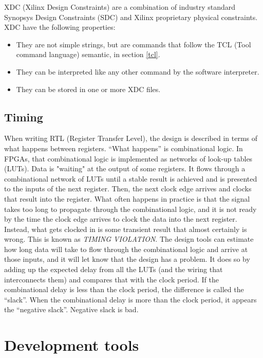 \noindent XDC (Xilinx Design Constraints) are a combination of industry standard Synopsys Design Constraints (SDC) and Xilinx proprietary physical constraints.
XDC have the following properties:
\begin{itemize}
	\item They are not simple strings, but are commands that follow the TCL (Tool command language) semantic, in section \ref{tcl}.
	\item They can be interpreted like any other command by the software interpreter.
	\item They can be stored in one or more XDC files.
\end{itemize}

\subsection{Timing}
\noindent When writing RTL (Register Transfer Level)\cite{timing}, the design is described in terms of what happens between registers. “What happens” is combinational logic. In FPGAs, that combinational logic is implemented as networks of look-up tables (LUTs). Data is "waiting" at the output of some registers. It flows through a combinational network of LUTs until a stable result is achieved and is presented to the inputs of the next register. Then, the next clock edge arrives and clocks that result into the register.
What often happens in practice is that the signal takes too long to propagate through the combinational logic, and it is not ready by the time the clock edge arrives to clock the data into the next register.
Instead, what gets clocked in is some transient result that almost certainly is wrong. This is known as \textit{TIMING VIOLATION}.
The design tools can estimate how long data will take to flow through the combinational logic and arrive at those inputs, and it will let know that the design has a problem. It does so by adding up the expected delay from all the LUTs (and the wiring that interconnects them) and compares that with the clock period.
If the combinational delay is less than the clock period, the difference is called the “slack”. When the combinational delay is more than the clock period, it appears the “negative slack”. Negative slack is bad.

\section{Development tools}

